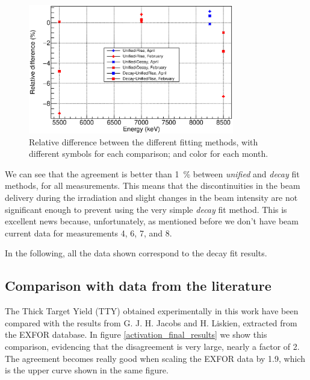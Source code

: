 \documentclass[a4paper,12pt]{report}
\begin{document}
\begin{figure}[H]
	\centering
	\includegraphics[width=0.80\textwidth]{activation_method_comparison.eps}	%
	\caption{Relative difference between the different fitting methods, with different symbols for each comparison; and color for each month.}
	\label{activation_method_comparison}
\end{figure}

We can see that the agreement is better than \qty{1}{\percent} between \textit{unified} and \textit{decay} fit methods, for all measurements.
This means that the discontinuities in the beam delivery during the irradiation and slight changes in the beam intensity are not significant enough to prevent using the very simple \textit{decay} fit method.
This is excellent news because, unfortunately, as mentioned before we don't have beam current data for measurements 4, 6, 7, and 8.

In the following, all the data shown correspond to the decay fit results.
\\

\subsection{Comparison with data from the literature}
The Thick Target Yield (TTY) obtained experimentally in this work have been compared with the results from G. J. H. Jacobs and H. Liskien\cite{jacobs}, extracted from the EXFOR database.
In figure \ref{activation_final_results} we show this comparison, evidencing that the disagreement is very large, nearly a factor of \num{2}.
The agreement becomes really good when scaling the EXFOR data by 1.9, which is the upper curve shown in the same figure.
\end{document}
